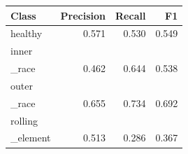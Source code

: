 \begin{tabular}{lrrr}
\hline
Class & Precision & Recall & F1 \\
\hline
healthy & 0.571 & 0.530 & 0.549 \\
inner\\_race & 0.462 & 0.644 & 0.538 \\
outer\\_race & 0.655 & 0.734 & 0.692 \\
rolling\\_element & 0.513 & 0.286 & 0.367 \\
\hline
\end{tabular}
